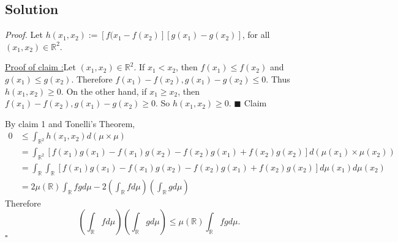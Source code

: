 \documentclass[12pt]{article}
\newcounter{ProofCounter}
\newcounter{ClaimCounter}[ProofCounter]
\newenvironment{Proof}{\stepcounter{ProofCounter}\textit{Proof.}}{\hfill$\square$}
\newenvironment{claim}[1]{\vspace{3mm}\stepcounter{ClaimCounter}\par\noindent\underline{\bf Claim \theClaimCounter:}\space#1}{}
\newenvironment{claimproof}[1]{\par\noindent\underline{Proof of claim \theClaimCounter:}\space#1}{\hfill $\blacksquare$ Claim \theClaimCounter}
\begin{document}
\subsection*{Solution}
\begin{Proof}
Let $h(x_{1}, x_{2}) := [f(x_{1} - f(x_{2})][g(x_{1}) - g(x_{2})]$, for all $(x_{1}, x_{2}) \in \mathbb{R}^{2}$.

\begin{claimproof}
Let $(x_{1}, x_{2}) \in \mathbb{R}^{2}$. If $x_{1} < x_{2}$, then $f(x_{1}) \leq f(x_{2})$ and $g(x_{1}) \leq g(x_{2})$. Therefore $f(x_{1}) -
f(x_{2}), g(x_{1}) - g(x_{2}) \leq 0$. Thus $h(x_{1}, x_{2}) \geq 0$. On the other hand, if $x_{1} \geq x_{2}$, then $f(x_{1}) - f(x_{2}), g(x_{1}) -
g(x_{2}) \geq 0$. So $h(x_{1}, x_{2}) \geq 0$.
\end{claimproof}

By claim 1 and Tonelli's Theorem,
\begin{align*}
0 & \leq \int_{\mathbb{R}^{2}}h(x_{1}, x_{2})d(\mu\times\mu) \\
& = \int_{\mathbb{R}^{2}}\left[ f(x_{1})g(x_{1}) - f(x_{1})g(x_{2}) - f(x_{2})g(x_{1}) + f(x_{2})g(x_{2}) \right]d(\mu(x_{1})\times\mu(x_{2})) \\
& = \int_{\mathbb{R}}\int_{\mathbb{R}} \left[ f(x_{1})g(x_{1}) - f(x_{1})g(x_{2}) - f(x_{2})g(x_{1}) + f(x_{2})g(x_{2})
\right] d\mu(x_{1})d\mu(x_{2}) \\
& = 2\mu(\mathbb{R})\int_{\mathbb{R}}fgd\mu - 2\left( \int_{\mathbb{R}}fd\mu \right)\left( \int_{\mathbb{R}}gd\mu \right)
\end{align*}
Therefore 
\[ \left( \int_{\mathbb{R}}fd\mu \right)\left( \int_{\mathbb{R}}gd\mu \right) \leq \mu(\mathbb{R})\int_{\mathbb{R}}fgd\mu. \]
\end{Proof}


\newpage 
\end{document}
